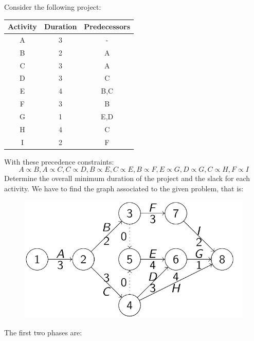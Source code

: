 \documentclass[12pt, a4paper]{report}
\begin{document}
    \begin{example}
        Consider the following project: 
        \begin{table}[H]
            \centering
            \begin{tabular}{ccc}
            \hline
            \textbf{Activity} & \textbf{Duration} & \textbf{Predecessors} \\ \hline
            A                 & 3                 & -                     \\
            B                 & 2                 & A                     \\
            C                 & 3                 & A                     \\
            D                 & 3                 & C                     \\
            E                 & 4                 & B,C                   \\
            F                 & 3                 & B                     \\
            G                 & 1                 & E,D                   \\
            H                 & 4                 & C                     \\
            I                 & 2                 & F                     \\ \hline
            \end{tabular}
        \end{table}
        With these precedence constraints: 
        \[A \varpropto B,A \varpropto C,C \varpropto D,B \varpropto E, C \varpropto E,B \varpropto F,E \varpropto G,D \varpropto G,C \varpropto H,F \varpropto I\]
        Determine the overall minimum duration of the project and the slack for each activity. We have to find the graph associated to the given problem, that is: 
        \begin{figure}[H]
            \centering
            \includegraphics[width=0.5\linewidth]{images/eproject.png}
        \end{figure}
        The first two phases are: 

\end{example}
\end{document}
